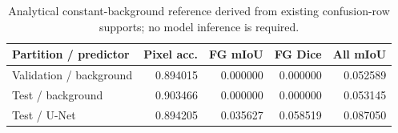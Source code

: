 \begin{table}[H]
\centering\small
\caption{Analytical constant-background reference derived from existing confusion-row supports; no model inference is required.}\label{tab:background}
\begin{tabular}{lrrrr}\toprule
Partition / predictor & Pixel acc. & FG mIoU & FG Dice & All mIoU \\ \midrule
Validation / background & 0.894015 & 0.000000 & 0.000000 & 0.052589 \\
Test / background & 0.903466 & 0.000000 & 0.000000 & 0.053145 \\
Test / U-Net & 0.894205 & 0.035627 & 0.058519 & 0.087050 \\
\bottomrule\end{tabular}
\end{table}
